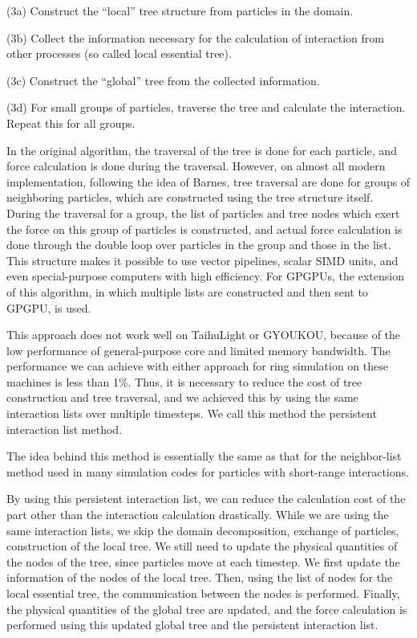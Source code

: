 \documentclass[conference]{IEEEtran}
\begin{document}
\begin{description}

\item{(3a)} Construct the ``local'' tree structure from particles in
  the domain.
\item{(3b)} Collect the information necessary for the calculation of
  interaction from other processes (so called local essential tree).
\item{(3c)} Construct the ``global'' tree from the collected information.
\item{(3d)} For small groups of particles, traverse the tree and
  calculate the interaction. Repeat this for all groups.
\end{description}
In the original algorithm\cite{BarnesHut1986}, the traversal of the
tree is done for each particle, and force calculation is done during
the traversal. However, on almost all modern implementation, following
the idea of Barnes\cite{Barnes1990}, tree traversal are done for
groups of neighboring particles, which are constructed using the tree
structure itself. During the traversal for a group, the list of
particles and tree nodes which exert the force on this group of
particles is constructed, and actual force calculation is done through
the double loop over particles in the group and those in the
list. This structure makes it possible to use vector pipelines, scalar
SIMD units, and even special-purpose computers\cite{Makino1991c} with
high efficiency. For GPGPUs, the extension of this algorithm, in which
multiple lists are constructed and then sent to GPGPU, is
used\cite{Hamadaetal2009}.

This approach does not work well on TaihuLight or GYOUKOU, because of
the low performance of general-purpose core and limited memory bandwidth. 
The
performance we can achieve with either approach for ring simulation on
these machines is less than 1\%.
Thus, it is necessary to reduce the cost of tree construction and tree
traversal, and we achieved this by using the same interaction lists
over multiple timesteps. We call this method the persistent
interaction list method.

The idea behind this method is essentially the same as that for
the  neighbor-list method used in many simulation codes for particles
with short-range  interactions. 

By using this persistent interaction list, we can reduce the
calculation cost of the part other than the interaction calculation
drastically. While we are using the same interaction lists, we skip the
domain decomposition, exchange of particles, construction of the local
tree. We still need to update the physical quantities of the nodes of
the tree, since particles move at each timestep.
We first update the information of the nodes of
the local tree. Then,
using the list of nodes for the local essential tree, the
communication between the nodes is performed. Finally, the physical
quantities of the global tree are updated, and the force calculation is
performed using this updated global tree and the persistent
interaction list.
\end{document}
